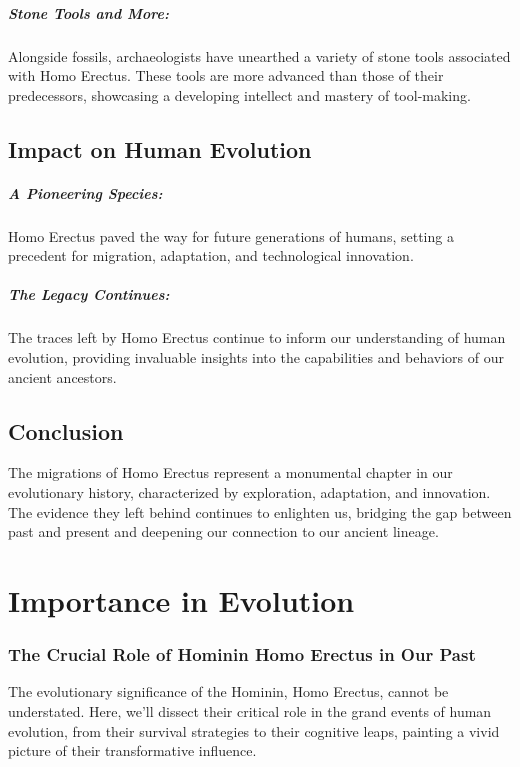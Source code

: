 \documentclass[a4paper,12pt]{book}
\begin{document}
\paragraph{Stone Tools and More:}
Alongside fossils, archaeologists have unearthed a variety of stone tools associated with Homo Erectus. These tools are more advanced than those of their predecessors, showcasing a developing intellect and mastery of tool-making.

\section*{Impact on Human Evolution}

\paragraph{A Pioneering Species:}
Homo Erectus paved the way for future generations of humans, setting a precedent for migration, adaptation, and technological innovation. 

\paragraph{The Legacy Continues:}
The traces left by Homo Erectus continue to inform our understanding of human evolution, providing invaluable insights into the capabilities and behaviors of our ancient ancestors.

\section*{Conclusion}

The migrations of Homo Erectus represent a monumental chapter in our evolutionary history, characterized by exploration, adaptation, and innovation. The evidence they left behind continues to enlighten us, bridging the gap between past and present and deepening our connection to our ancient lineage.

\chapter{Importance in Evolution}
\subsection*{The Crucial Role of Hominin Homo Erectus in Our Past}
The evolutionary significance of the Hominin, Homo Erectus, cannot be understated. Here, we'll dissect their critical role in the grand events of human evolution, from their survival strategies to their cognitive leaps, painting a vivid picture of their transformative influence.
\end{document}
